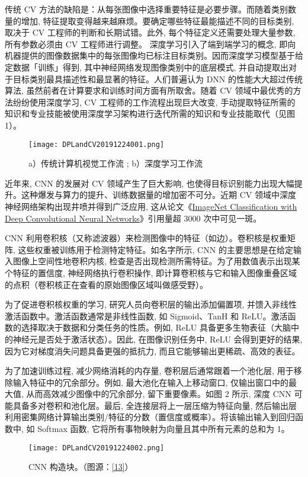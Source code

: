 传统 CV 方法的缺陷是：从每张图像中选择重要特征是必要步骤。而随着类别数量的增加, 特征提取变得越来越麻烦。要确定哪些特征最能描述不同的目标类别, 取决于 CV 工程师的判断和长期试错。此外, 每个特征定义还需要处理大量参数, 所有参数必须由 CV 工程师进行调整。
深度学习引入了端到端学习的概念, 即向机器提供的图像数据集中的每张图像均已标注目标类别。因而深度学习模型基于给定数据「训练」得到, 其中神经网络发现图像类别中的底层模式, 并自动提取出对于目标类别最具描述性和最显著的特征。人们普遍认为 DNN 的性能大大超过传统算法, 虽然前者在计算要求和训练时间方面有所取舍。随着 CV 领域中最优秀的方法纷纷使用深度学习, CV 工程师的工作流程出现巨大改变, 手动提取特征所需的知识和专业技能被使用深度学习架构进行迭代所需的知识和专业技能取代（见图 1）。
\begin{figure}[http]
    \centering
    \texttt{[image: DPLandCV20191224001.png]}
    \caption{a）传统计算机视觉工作流 ; b）深度学习工作流\cite{WANG2018144}}
    \label{DPLandCV20191224001}
\end{figure}

近年来, CNN 的发展对 CV 领域产生了巨大影响, 也使得目标识别能力出现大幅提升。这种爆发与算力的提升、训练数据量的增加密不可分。近期 CV 领域中深度神经网络架构出现井喷并得到广泛应用, 这从论文《\href{http://papers.nips.cc/paper/4824-imagenet-classification-with-deep-convolutional-neural-networks}{ImageNet Classification with Deep Convolutional Neural Networks}》引用量超 3000 次中可见一斑。

CNN 利用卷积核（又称滤波器）来检测图像中的特征（如边）。卷积核是权重矩阵, 这些权重被训练用于检测特定特征。如名字所示, CNN 的主要思想是在给定输入图像上空间性地卷积内核, 检查是否出现检测所需特征。为了用数值表示出现某个特征的置信度, 神经网络执行卷积操作, 即计算卷积核与它和输入图像重叠区域的点积（卷积核正在查看的原始图像区域叫做感受野）。

为了促进卷积核权重的学习, 研究人员向卷积层的输出添加偏置项, 并馈入非线性激活函数中。激活函数通常是非线性函数, 如 Sigmoid、TanH 和 ReLU。激活函数的选择取决于数据和分类任务的性质。例如, ReLU 具备更多生物表征（大脑中的神经元是否处于激活状态）。因此, 在图像识别任务中, ReLU 会得到更好的结果, 因为它对梯度消失问题具备更强的抵抗力, 而且它能够输出更稀疏、高效的表征。

为了加速训练过程, 减少网络消耗的内存量, 卷积层后通常跟着一个池化层, 用于移除输入特征中的冗余部分。例如, 最大池化在输入上移动窗口, 仅输出窗口中的最大值, 从而高效减少图像中的冗余部分, 留下重要像素。如图 2 所示, 深度 CNN 可能具备多对卷积和池化层。最后, 全连接层将上一层压缩为特征向量, 然后输出层利用密集网络计算输出类别/特征的分数（置信度或概率）。将该输出输入到回归函数中, 如 Softmax 函数, 它将所有事物映射为向量且其中所有元素的总和为 1。
\begin{figure}[http]
\centering
\texttt{[image: DPLandCV20191224002.png]}
\caption{CNN 构造块。（图源：\href{https://adeshpande3.github.io/adeshpande3.github.io/A-Beginner\%27s-Guide-To-Understanding-Convolutional-Neural-Networks/}{[13]}）}
\label{DPLandCV20191224002}
\end{figure}


